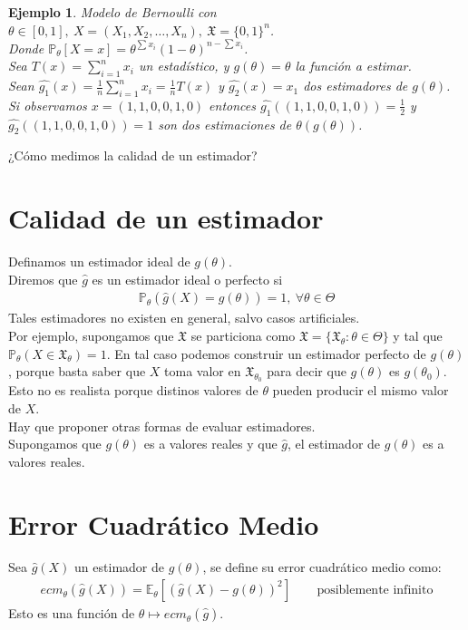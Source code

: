 \documentclass[10pt]{article}
\theoremstyle{plain}
\newtheorem{ej}{Ejemplo}
\theoremstyle{definition}
\begin{document}
\begin{ej} Modelo de Bernoulli con $\theta \in \left[0,1\right],\ X = (X_{1}, X_{2}, \ldots, X_{n}),\ \mathfrak{X} = \{0,1\}^n$.\\
Donde $\mathbb{P}_{\theta}\left[X=x\right] = \theta^{\sum{x_{i}}}(1-\theta)^{n-\sum{x_{i}}}$.\\
Sea $T(x) = \sum_{i=1}^n{x_{i}}$ un estadístico, y $g(\theta) = \theta$ la función a estimar.\\

Sean $\hat{g_{1}}(x) = \frac{1}{n}\sum_{i=1}^n{x_{i}} = \frac{1}{n}T(x)$ y $\hat{g_{2}}(x) = x_{1}$ dos estimadores de $g(\theta)$.\\
Si observamos $x=(1,1,0,0,1,0)$ entonces $\hat{g_{1}}((1,1,0,0,1,0)) = \frac{1}{2}$ y $\hat{g_{2}}((1,1,0,0,1,0)) = 1$ son dos estimaciones de $\theta (g(\theta))$.\\
\end{ej}
¿Cómo medimos la calidad de un estimador?

\section{Calidad de un estimador}
Definamos un estimador ideal de $g(\theta)$.\\
 Diremos que $\hat{g}$ es un estimador ideal o perfecto si
 \begin{align*}
 \mathbb{P}_{\theta}(\hat{g}(X) = g(\theta)) = 1,\ \forall \theta \in \Theta
 \end{align*}
Tales estimadores no existen en general, salvo casos artificiales.\\

Por ejemplo, supongamos que $\mathfrak{X}$ se particiona como $\mathfrak{X} = \{\mathfrak{X}_{\theta}\colon \theta \in \Theta\}$ y tal que $\mathbb{P}_{\theta}(X \in \mathfrak{X}_{\theta}) = 1$. En tal caso podemos construir un estimador perfecto de $g(\theta)$, porque basta saber que $X$ toma valor en $\mathfrak{X}_{\theta_{0}}$ para decir que $g(\theta)$ es $g(\theta_{0})$.\\
Esto no es realista porque distinos valores de $\theta$ pueden producir el mismo valor de $X$.\\
Hay que proponer otras formas de evaluar estimadores.\\
Supongamos que $g(\theta)$ es a valores reales y que $\hat{g}$, el estimador de $g(\theta)$ es a valores reales.

\section{Error Cuadrático Medio}
Sea $\hat{g}(X)$ un estimador de $g(\theta)$, se define su error cuadrático medio como:
\begin{align*}
ecm_{\theta}(\hat{g}(X)) = \mathbb{E}_{\theta}\left[(\hat{g}(X) - g(\theta))^2\right]\ &\quad \text{posiblemente infinito}
\end{align*}
Esto es una función de $\theta \mapsto ecm_{\theta}(\hat{g})$.\\
\end{document}
